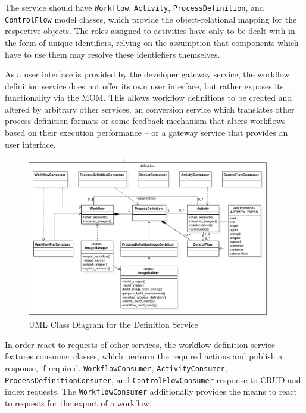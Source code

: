    The service should have \texttt{Workflow}, \texttt{Activity}, \texttt{ProcessDefinition}, and \texttt{ControlFlow} model classes, which provide the object-relational mapping for the respective objects. The roles assigned to activities have only to be dealt with in the form of unique identifiers, relying on the assumption that components which have to use them may resolve these identiefiers themselves.

    As a user interface is provided by the developer gateway service, the workflow definition service does not offer its own user interface, but rather exposes its functionality via the \ac{MOM}. This allows workflow definitions to be created and altered by arbitrary other services, \eg an conversion service which translates other process definition formats or some feedback mechanism that alters workflows based on their execution performance -- or a gateway service that provides an user interface.

    \begin{figure}[htbp]
      \centering
      \includegraphics[width=0.95\textwidth]{content/images/class_diagram_definition-crop.pdf}
      \caption{UML Class Diagram for the Definition Service}
      \label{fig:uml_class_diagram_for_the_definition_service}
    \end{figure}

    In order react to requests of other services, the workflow definition service features consumer classes, which perform the required actions and publish a response, if required. \texttt{WorkflowConsumer}, \texttt{ActivityConsumer}, \texttt{ProcessDefinitionConsumer}, and \texttt{ControlFlowConsumer} response to \ac{CRUD} and index requests. The \texttt{WorkflowConsumer} additionally provides the means to react to requests for the export of a workflow.

